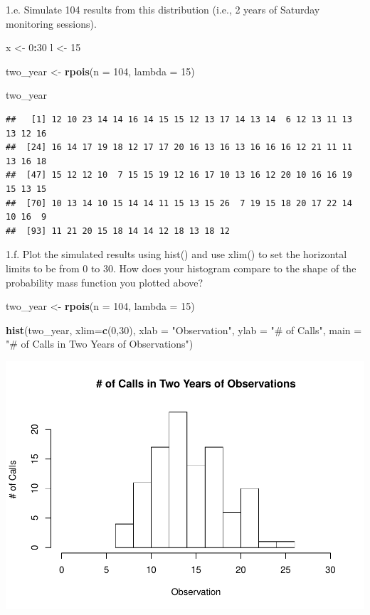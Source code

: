 \documentclass[]{article}
\newenvironment{Shaded}{\begin{snugshade}}{\end{snugshade}}
\newcommand{\KeywordTok}[1]{\textcolor[rgb]{0.13,0.29,0.53}{\textbf{#1}}}
\newcommand{\DataTypeTok}[1]{\textcolor[rgb]{0.13,0.29,0.53}{#1}}
\newcommand{\DecValTok}[1]{\textcolor[rgb]{0.00,0.00,0.81}{#1}}
\newcommand{\StringTok}[1]{\textcolor[rgb]{0.31,0.60,0.02}{#1}}
\newcommand{\OperatorTok}[1]{\textcolor[rgb]{0.81,0.36,0.00}{\textbf{#1}}}
\newcommand{\NormalTok}[1]{#1}
\begin{document}
1.e. Simulate 104 results from this distribution (i.e., 2 years of
Saturday monitoring sessions).

\begin{Shaded}
\begin{Highlighting}[]
\NormalTok{x <-}\StringTok{ }\DecValTok{0}\OperatorTok{:}\DecValTok{30}
\NormalTok{l <-}\StringTok{ }\DecValTok{15}

\NormalTok{two_year <-}\StringTok{ }\KeywordTok{rpois}\NormalTok{(}\DataTypeTok{n =} \DecValTok{104}\NormalTok{, }\DataTypeTok{lambda =} \DecValTok{15}\NormalTok{)}


\NormalTok{two_year}
\end{Highlighting}
\end{Shaded}

\begin{verbatim}
##   [1] 12 10 23 14 14 16 14 15 15 12 13 17 14 13 14  6 12 13 11 13 13 12 16
##  [24] 16 14 17 19 18 12 17 17 20 16 13 16 13 16 16 16 12 21 11 11 13 16 18
##  [47] 15 12 12 10  7 15 15 19 12 16 17 10 13 16 12 20 10 16 16 19 15 13 15
##  [70] 10 13 14 10 15 14 14 11 15 13 15 26  7 19 15 18 20 17 22 14 10 16  9
##  [93] 11 21 20 15 18 14 14 12 18 13 18 12
\end{verbatim}

1.f. Plot the simulated results using hist() and use xlim() to set the
horizontal limits to be from 0 to 30. How does your histogram compare to
the shape of the probability mass function you plotted above?

\begin{Shaded}
\begin{Highlighting}[]
\NormalTok{two_year <-}\StringTok{ }\KeywordTok{rpois}\NormalTok{(}\DataTypeTok{n =} \DecValTok{104}\NormalTok{, }\DataTypeTok{lambda =} \DecValTok{15}\NormalTok{)}

\KeywordTok{hist}\NormalTok{(two_year, }\DataTypeTok{xlim=}\KeywordTok{c}\NormalTok{(}\DecValTok{0}\NormalTok{,}\DecValTok{30}\NormalTok{), }\DataTypeTok{xlab =} \StringTok{"Observation"}\NormalTok{, }\DataTypeTok{ylab =} \StringTok{"# of Calls"}\NormalTok{, }\DataTypeTok{main =} \StringTok{"# of Calls in Two Years of Observations"}\NormalTok{)}
\end{Highlighting}
\end{Shaded}

\includegraphics{Locker-Angelina-ADA-Homework-02_files/figure-latex/unnamed-chunk-7-1.pdf}
\end{document}
